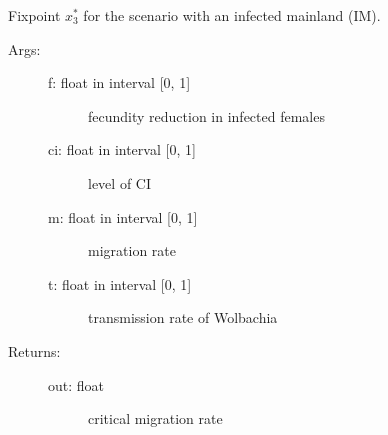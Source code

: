 \documentclass[letterpaper,10pt,english]{sphinxmanual}
\begin{document}
\begin{fulllineitems}
\label{index:wspec.analytical.fix3_IM}
Fixpoint $x_3^{\ast}$ for the scenario with an infected mainland (IM).
\begin{description}
\item[{Args:}] \leavevmode\begin{description}
\item[{f: float in interval {[}0, 1{]}}] \leavevmode
fecundity reduction in infected females

\item[{ci: float in interval {[}0, 1{]}}] \leavevmode
level of CI

\item[{m: float in interval {[}0, 1{]}}] \leavevmode
migration rate

\item[{t: float in interval {[}0, 1{]}}] \leavevmode
transmission rate of Wolbachia

\end{description}

\item[{Returns:}] \leavevmode\begin{description}
\item[{out: float}] \leavevmode
critical migration rate

\end{description}

\end{description}

\end{fulllineitems}

\end{document}
